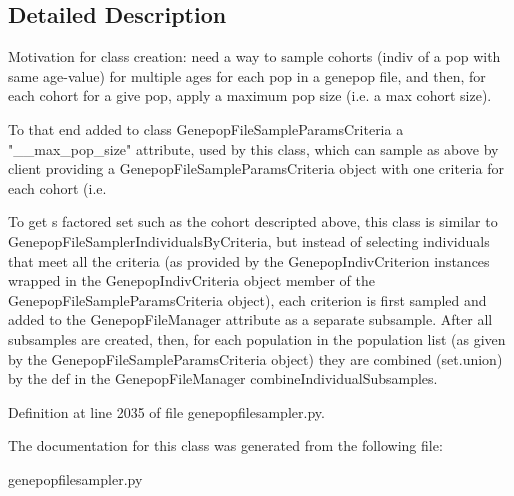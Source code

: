 \subsection{Detailed Description}
\begin{DoxyVerb}Motivation for class creation:  need a way to sample cohorts (indiv
of a pop with same age-value) for multiple ages for each pop in 
a genepop file, and then, for each cohort for a give pop, apply a maximum
pop size (i.e. a max cohort size).

To that end added to class GenepopFileSampleParamsCriteria a "__max_pop_size"
attribute, used by this class, which can sample as above by client providing
a GenepopFileSampleParamsCriteria object with one criteria for each cohort
(i.e. %

To get s factored set such as the cohort descripted above, this class
is similar to GenepopFileSamplerIndividualsByCriteria, but
instead of selecting individuals that meet all the criteria (as provided
by the GenepopIndivCriterion instances wrapped in the GenepopIndivCriteria
object member of the GenepopFileSampleParamsCriteria object), each criterion
is first sampled and added to the GenepopFileManager attribute as a separate
subsample.  After all subsamples are created, then, for each population in
the population list (as given by the GenepopFileSampleParamsCriteria object)
they are combined (set.union) by the def in the GenepopFileManager 
combineIndividualSubsamples.
\end{DoxyVerb}
 

Definition at line 2035 of file genepopfilesampler.\+py.



The documentation for this class was generated from the following file\+:\begin{DoxyCompactItemize}
\item 
genepopfilesampler.\+py\end{DoxyCompactItemize}
